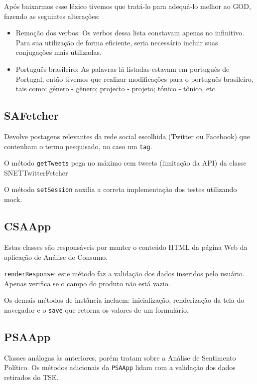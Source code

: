 Após baixarmos esse léxico tivemos que tratá-lo para adequá-lo melhor ao GOD, fazendo as seguintes alterações:

\begin{itemize}

	\item Remoção dos verbos:
	Os verbos dessa lista constavam apenas no infinitivo. Para sua utilização de forma eficiente, seria necessário incluir suas conjugações mais utilizadas.
	
	\item Português brasileiro:
	As palavras lá listadas estavam em português de Portugal, então tivemos que realizar modificações para o português brasileiro, tais como: género - gênero; projecto - projeto; tónico - tônico, etc.
	
\end{itemize}

\subsection{SAFetcher}
Devolve postagens relevantes da rede social escolhida (Twitter ou Facebook) que contenham o termo pesquisado, no caso um \texttt{tag}.

O método \texttt{getTweets} pega no máximo cem tweets (limitação da API) da classe SNETTwitterFetcher

O método \texttt{setSession} auxilia a correta implementação dos testes utilizando mock.

\subsection{CSAApp}
Estas classes são responsáveis por manter o conteúdo HTML da página Web da aplicação de Análise de Consumo.

\texttt{renderResponse}: este método faz a validação dos dados inseridos pelo usuário. Apenas verifica se o campo do produto não está vazio.

Os demais métodos de instância incluem: inicialização, renderização da tela do navegador e o \texttt{save} que retorna os valores de um formulário.

\subsection{PSAApp}
Classes análogas às anteriores, porém tratam sobre a Análise de Sentimento Político. Os métodos adicionais da \texttt{PSAApp} lidam com a validação dos dados retirados do TSE.

